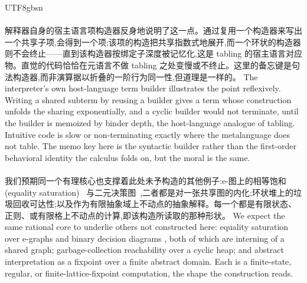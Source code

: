 \begin{CJK*}{UTF8}{gbsn}
  \paragraph{}
  \ifPaperChinese
  解释器自身的宿主语言项构造器反身地说明了这一点。通过复用一个构造器来写出一个共享子项,会得到一个项;该项的构造把共享指数式地展开,而一个环状的构造器则不会终止——直到该构造器按绑定子深度被记忆化,这是 tabling 的宿主语言对应物。直觉的代码恰恰在元语言不做 tabling 之处变慢或不终止。这里的备忘键是句法构造器,而非演算据以折叠的一阶行为同一性,但道理是一样的。
  \else
  The interpreter's own host-language term builder illustrates the point reflexively. Writing a shared subterm by reusing a builder gives a term whose construction unfolds the sharing exponentially, and a cyclic builder would not terminate, until the builder is memoized by binder depth, the host-language analogue of tabling. Intuitive code is slow or non-terminating exactly where the metalanguage does not table. The memo key here is the syntactic builder rather than the first-order behavioral identity the calculus folds on, but the moral is the same.
  \fi

  \paragraph{}
  \ifPaperChinese
  我们预期同一个有理核心也支撑着此处未予构造的其他例子:e-图上的相等饱和(equality saturation)~\cite{willsey2021-egg, zhang2023-egglog} 与二元决策图~\cite{bryant1986-bdd},二者都是对一张共享图的内化;环状堆上的垃圾回收可达性;以及作为有限抽象域上不动点的抽象解释。每一个都是有限状态、正则、或有限格上不动点的计算,即该构造所读取的那种形状。
  \else
  We expect the same rational core to underlie others not constructed here: equality saturation over e-graphs
  \cite{willsey2021-egg, zhang2023-egglog} and binary decision diagrams \cite{bryant1986-bdd}, both of which are interning of a shared graph; garbage-collection reachability over a cyclic heap; and abstract interpretation as a fixpoint over a finite abstract domain. Each is a finite-state, regular, or finite-lattice-fixpoint computation, the shape the construction reads.
  \fi


\end{CJK*}
